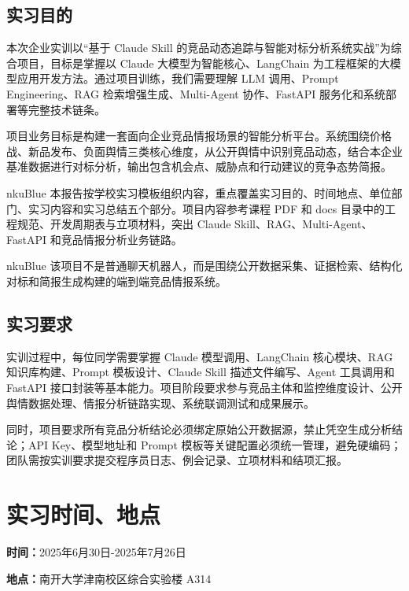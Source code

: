 \documentclass[UTF8,zihao=-4,a4paper]{ctexart}
\newcommand{\infoline}[2]{%
  \noindent\textbf{#1：}#2\par
}
\begin{document}
\subsection{实习目的}

本次企业实训以“基于 Claude Skill 的竞品动态追踪与智能对标分析系统实战”为综合项目，目标是掌握以 Claude 大模型为智能核心、LangChain 为工程框架的大模型应用开发方法。通过项目训练，我们需要理解 LLM 调用、Prompt Engineering、RAG 检索增强生成、Multi-Agent 协作、FastAPI 服务化和系统部署等完整技术链条。

项目业务目标是构建一套面向企业竞品情报场景的智能分析平台。系统围绕价格战、新品发布、负面舆情三类核心维度，从公开舆情中识别竞品动态，结合本企业基准数据进行对标分析，输出包含机会点、威胁点和行动建议的竞争态势简报。

\begin{reportbox}[实训目标概览]{nkuBlue}
本报告按学校实习模板组织内容，重点覆盖实习目的、时间地点、单位部门、实习内容和实习总结五个部分。项目内容参考课程 PDF 和 docs 目录中的工程规范、开发周期表与立项材料，突出 Claude Skill、RAG、Multi-Agent、FastAPI 和竞品情报分析业务链路。
\end{reportbox}

\begin{reportbox}[说明]{nkuBlue}
该项目不是普通聊天机器人，而是围绕公开数据采集、证据检索、结构化对标和简报生成构建的端到端竞品情报系统。
\end{reportbox}

\subsection{实习要求}

实训过程中，每位同学需要掌握 Claude 模型调用、LangChain 核心模块、RAG 知识库构建、Prompt 模板设计、Claude Skill 描述文件编写、Agent 工具调用和 FastAPI 接口封装等基本能力。项目阶段要求参与竞品主体和监控维度设计、公开舆情数据处理、情报分析链路实现、系统联调测试和成果展示。

同时，项目要求所有竞品分析结论必须绑定原始公开数据源，禁止凭空生成分析结论；API Key、模型地址和 Prompt 模板等关键配置必须统一管理，避免硬编码；团队需按实训要求提交程序员日志、例会记录、立项材料和结项汇报。

\section{实习时间、地点}

\infoline{时间}{2025年6月30日-2025年7月26日}
\infoline{地点}{南开大学津南校区综合实验楼 A314}
\end{document}
